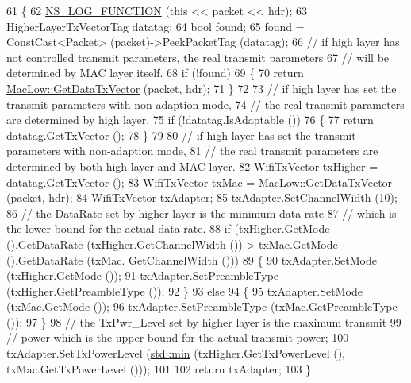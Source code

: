 \begin{DoxyCode}
61 \{
62   \hyperlink{log-macros-disabled_8h_a90b90d5bad1f39cb1b64923ea94c0761}{NS\_LOG\_FUNCTION} (\textcolor{keyword}{this} << packet << hdr);
63   HigherLayerTxVectorTag datatag;
64   \textcolor{keywordtype}{bool} found;
65   found = ConstCast<Packet> (packet)->PeekPacketTag (datatag);
66   \textcolor{comment}{// if high layer has not controlled transmit parameters, the real transmit parameters}
67   \textcolor{comment}{// will be determined by MAC layer itself.}
68   \textcolor{keywordflow}{if} (!found)
69     \{
70       \textcolor{keywordflow}{return} \hyperlink{classns3_1_1MacLow_a04bad04eade9ff1de0940b01c5bcf514}{MacLow::GetDataTxVector} (packet, hdr);
71     \}
72 
73   \textcolor{comment}{// if high layer has set the transmit parameters with non-adaption mode,}
74   \textcolor{comment}{// the real transmit parameters are determined by high layer.}
75   \textcolor{keywordflow}{if} (!datatag.IsAdaptable ())
76     \{
77       \textcolor{keywordflow}{return} datatag.GetTxVector ();
78     \}
79 
80   \textcolor{comment}{// if high layer has set the transmit parameters with non-adaption mode,}
81   \textcolor{comment}{// the real transmit parameters are determined by both high layer and MAC layer.}
82   WifiTxVector txHigher = datatag.GetTxVector ();
83   WifiTxVector txMac = \hyperlink{classns3_1_1MacLow_a04bad04eade9ff1de0940b01c5bcf514}{MacLow::GetDataTxVector} (packet, hdr);
84   WifiTxVector txAdapter;
85   txAdapter.SetChannelWidth (10);
86   \textcolor{comment}{// the DataRate set by higher layer is the minimum data rate}
87   \textcolor{comment}{// which is the lower bound for the actual data rate.}
88   \textcolor{keywordflow}{if} (txHigher.GetMode ().GetDataRate (txHigher.GetChannelWidth ()) > txMac.GetMode ().GetDataRate (txMac.
      GetChannelWidth ()))
89     \{
90       txAdapter.SetMode (txHigher.GetMode ());
91       txAdapter.SetPreambleType (txHigher.GetPreambleType ());
92     \}
93   \textcolor{keywordflow}{else}
94     \{
95       txAdapter.SetMode (txMac.GetMode ());
96       txAdapter.SetPreambleType (txMac.GetPreambleType ());
97     \}
98   \textcolor{comment}{// the TxPwr\_Level set by higher layer is the maximum transmit}
99   \textcolor{comment}{// power which is the upper bound for the actual transmit power;}
100   txAdapter.SetTxPowerLevel (\hyperlink{80211b_8c_ac6afabdc09a49a433ee19d8a9486056d}{std::min} (txHigher.GetTxPowerLevel (), txMac.GetTxPowerLevel ()));
101 
102   \textcolor{keywordflow}{return} txAdapter;
103 \}
\end{DoxyCode}


